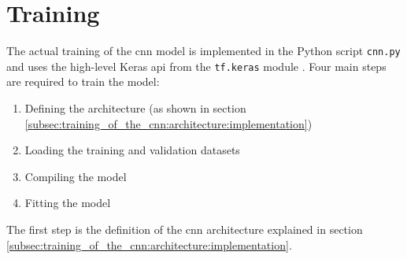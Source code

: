 \section{Training}
\label{sec:training_of_the_cnn:training}

The actual training of the \acrlong{cnn} model is implemented in the Python script \texttt{cnn.py} and uses the high-level Keras \acrshort{api} from the \texttt{tf.keras} module \cite{}. %
Four main steps are required to train the model:

\begin{enumerate}
  \item Defining the architecture (as shown in section \ref{subsec:training_of_the_cnn:architecture:implementation})
  \item Loading the training and validation datasets
  \item Compiling the model
  \item Fitting the model
\end{enumerate}

The first step is the definition of the \acrshort{cnn} architecture explained in section \ref{subsec:training_of_the_cnn:architecture:implementation}.

